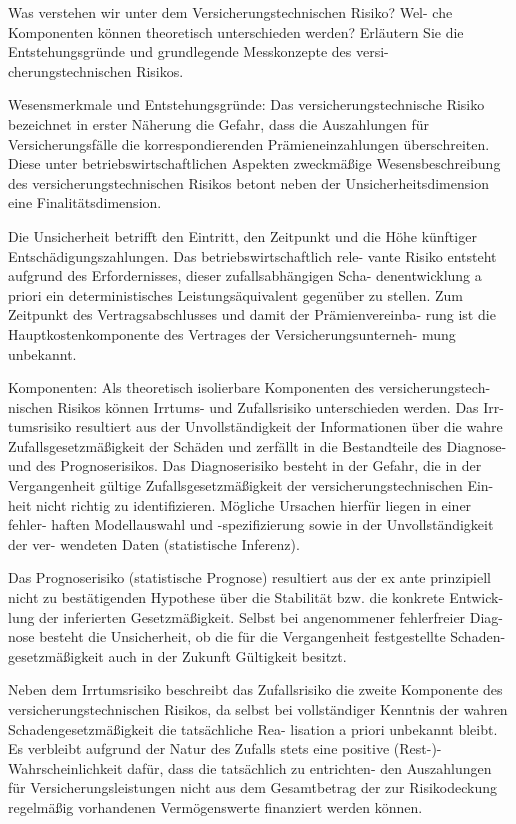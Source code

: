 Was verstehen wir unter dem Versicherungstechnischen Risiko? Wel-
che Komponenten können theoretisch unterschieden werden? Erläutern
Sie die Entstehungsgründe und grundlegende Messkonzepte des versi-
cherungstechnischen Risikos.

Wesensmerkmale und Entstehungsgründe: Das versicherungstechnische Risiko bezeichnet in erster Näherung die Gefahr, 
dass die Auszahlungen für Versicherungsfälle die korrespondierenden Prämieneinzahlungen überschreiten. 
Diese unter betriebswirtschaftlichen Aspekten zweckmäßige Wesensbeschreibung des
versicherungstechnischen Risikos betont neben der Unsicherheitsdimension
eine Finalitätsdimension.

Die Unsicherheit betrifft den Eintritt, den Zeitpunkt
und die Höhe künftiger Entschädigungszahlungen. Das betriebswirtschaftlich rele-
vante Risiko entsteht aufgrund des Erfordernisses, dieser zufallsabhängigen Scha-
denentwicklung a priori ein deterministisches Leistungsäquivalent gegenüber zu
stellen. Zum Zeitpunkt des Vertragsabschlusses und damit der Prämienvereinba-
rung ist die Hauptkostenkomponente des Vertrages der Versicherungsunterneh-
mung unbekannt.


Komponenten: Als theoretisch isolierbare Komponenten des versicherungstech-
nischen Risikos können Irrtums- und Zufallsrisiko unterschieden werden. Das Irr-
tumsrisiko resultiert aus der Unvollständigkeit der Informationen über die wahre
Zufallsgesetzmäßigkeit der Schäden und zerfällt in die Bestandteile des Diagnose-
und des Prognoserisikos. Das Diagnoserisiko besteht in der Gefahr, die in der
Vergangenheit gültige Zufallsgesetzmäßigkeit der versicherungstechnischen Ein-
heit nicht richtig zu identifizieren. Mögliche Ursachen hierfür liegen in einer fehler-
haften Modellauswahl und -spezifizierung sowie in der Unvollständigkeit der ver-
wendeten Daten (statistische Inferenz).


Das Prognoserisiko (statistische Prognose) resultiert aus der ex ante prinzipiell
nicht zu bestätigenden Hypothese über die Stabilität bzw. die konkrete Entwick-
lung der inferierten Gesetzmäßigkeit. Selbst bei angenommener fehlerfreier Diag-
nose besteht die Unsicherheit, ob die für die Vergangenheit festgestellte Schaden-
gesetzmäßigkeit auch in der Zukunft Gültigkeit besitzt.


Neben dem Irrtumsrisiko beschreibt das Zufallsrisiko die zweite Komponente des versicherungstechnischen Risikos, 
da selbst bei vollständiger Kenntnis der wahren Schadengesetzmäßigkeit die tatsächliche Rea-
lisation a priori unbekannt bleibt. Es verbleibt aufgrund der Natur des Zufalls stets
eine positive (Rest-)-Wahrscheinlichkeit dafür, dass die tatsächlich zu entrichten-
den Auszahlungen für Versicherungsleistungen nicht aus dem Gesamtbetrag der
zur Risikodeckung regelmäßig vorhandenen Vermögenswerte finanziert werden
können.



